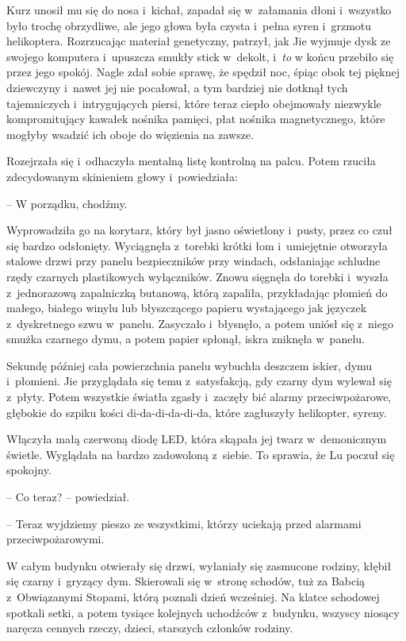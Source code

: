 \documentclass[oneside,polish,11pt,rmheadings]{mwbk}
\begin{document}
Kurz unosił mu się do nosa i~kichał, zapadał się w~załamania dłoni i~wszystko było trochę obrzydliwe, ale jego głowa była czysta i~pełna syren i~grzmotu helikoptera. Rozrzucając materiał genetyczny, patrzył, jak Jie wyjmuje dysk ze swojego komputera i~upuszcza smukły stick w~dekolt, i~\textit{to }w końcu przebiło się przez jego spokój. Nagle zdał sobie sprawę, że spędził noc, śpiąc obok tej pięknej dziewczyny i~nawet jej nie pocałował, a tym bardziej nie dotknął tych tajemniczych i~intrygujących piersi, które teraz ciepło obejmowały niezwykle kompromitujący kawałek nośnika pamięci, płat nośnika magnetycznego, które mogłyby wsadzić ich oboje do więzienia na zawsze.

Rozejrzała się i~odhaczyła mentalną listę kontrolną na palcu. Potem rzuciła zdecydowanym skinieniem głowy i~powiedziała: 

-- W porządku, chodźmy. 

Wyprowadziła go na korytarz, który był jasno oświetlony i~pusty, przez co czuł się bardzo odsłonięty. Wyciągnęła z~torebki krótki łom i~umiejętnie otworzyła stalowe drzwi przy panelu bezpieczników przy windach, odsłaniając schludne rzędy czarnych plastikowych wyłączników. Znowu sięgnęła do torebki i~wyszła z~jednorazową zapalniczką butanową, którą zapaliła, przykładając płomień do małego, białego winylu lub błyszczącego papieru wystającego jak języczek z~dyskretnego szwu w~panelu. Zasyczało i~błysnęło, a potem uniósł się z~niego smużka czarnego dymu, a potem papier spłonął, iskra zniknęła w~panelu.

Sekundę później cała powierzchnia panelu wybuchła deszczem iskier, dymu i~płomieni. Jie przyglądała się temu z~satysfakcją, gdy czarny dym wylewał się z~płyty. Potem wszystkie światła zgasły i~zaczęły bić alarmy przeciwpożarowe, głębokie do szpiku kości di-da-di-da-di-da, które zagłuszyły helikopter, syreny.

Włączyła małą czerwoną diodę LED, która skąpała jej twarz w~demonicznym świetle. Wyglądała na bardzo zadowoloną z~siebie. To sprawia, że Lu poczuł się spokojny.

-- Co teraz? -- powiedział.

-- Teraz wyjdziemy pieszo ze wszystkimi, którzy uciekają przed alarmami przeciwpożarowymi.

W całym budynku otwierały się drzwi, wyłaniały się zasmucone rodziny, kłębił się czarny i~gryzący dym. Skierowali się w~stronę schodów, tuż za Babcią z~Obwiązanymi Stopami, którą poznali dzień wcześniej. Na klatce schodowej spotkali setki, a potem tysiące kolejnych uchodźców z~budynku, wszyscy niosący naręcza cennych rzeczy, dzieci, starszych członków rodziny.
\end{document}
